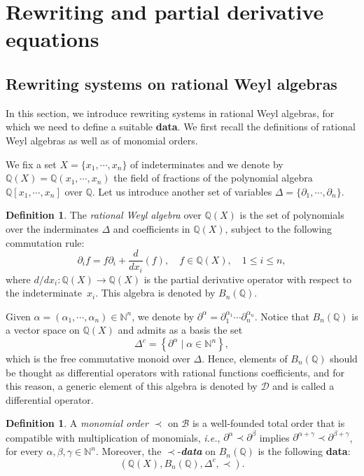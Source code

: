 \documentclass[10pt]{easychair}
\theoremstyle{definition}
\newtheorem{definition}[theorem]{Definition}
\newcommand\ie{\emph{i.e.}}
\newcommand\data{{\color{red}\bf data}}
\newcommand\diff[1]{\partial_{#1}}
\newcommand\D{\mathcal{D}}
\newcommand\basis{\mathscr{B}}
\newcommand\Q{\mathbb{Q}}
\newcommand\N{\mathbb{N}}
\newcommand\QX{\mathbb{Q}[x_1,\cdots,x_n]}
\newcommand\QXX{\mathbb{Q}(x_1,\cdots,x_n)}
\newcommand\Weyl{B_n(\Q)}
\begin{document}
\section{Rewriting and partial derivative equations}
\label{sec:rewriting_systems_and_partial_derivative_equations}

\subsection{Rewriting systems on rational Weyl algebras}
\label{sec:rewriting_systems_on_Weyl_algebras}

In this section, we introduce rewriting systems in rational Weyl
algebras, for which we need to define a suitable \data. We first recall
the definitions of rational Weyl algebras as well as of monomial orders.
\medskip

We fix a set $X=\{x_1,\cdots,x_n\}$ of indeterminates and we denote by
$\Q(X)=\QXX$ the field of fractions of the polynomial algebra $\QX$ over
$\Q$. Let us introduce another set of variables
$\Delta=\{\diff{1},\cdots,\diff{n}\}$.
\smallskip

\begin{definition}
  The {\it rational Weyl algebra} over $\Q(X)$ is the set of polynomials
  over the inderminates $\Delta$ and coefficients in $\Q(X)$, subject to
  the following commutation rule:
  \[\diff{i}f=f\diff{i}+\frac{d}{dx_i}(f),\quad f\in\Q(X),\quad
  1\leq i\leq n,\]
  where $d/dx_i:\Q(X)\to\Q(X)$ is the partial derivative operator with
  respect to the indeterminate~$x_i$. This algebra is denoted by $\Weyl$.
\end{definition}
\smallskip

Given $\alpha=(\alpha_1,\cdots,\alpha_n)\in\N^n$, we denote by 
$\partial^{\alpha}=\diff{1}^{\alpha_1}\cdots\diff{n}^{\alpha_n}$. Notice
that $\Weyl$ is a vector space on $\Q(X)$ and admits as a basis the set
\[\Delta^c=\left\{\partial^\alpha\mid\alpha\in\N^n\right\},\]
which is the free commutative monoid over $\Delta$. Hence, elements of
$\Weyl$ should be thought as differential operators with rational
functions coefficients, and for this reason, a generic element of this
algebra is denoted by $\D$ and is called a differential operator.
\smallskip

\begin{definition}
  A {\em monomial order} $\prec$ on $\basis$ is a well-founded total
  order that is compatible with multiplication of monomials, \ie,
  $\partial^{\alpha}\prec\partial^{\beta}$ implies 
  $\partial^{\alpha+\gamma}\prec\partial^{\beta+\gamma}$, for every
  $\alpha,\beta,\gamma\in\N^n$. Moreover, the $\prec$-{\it \data} on
  $\Weyl$ is the following \data:
  \[(\Q(X),\Weyl,\Delta^c,\prec).\]
\end{definition}
\smallskip
\end{document}
